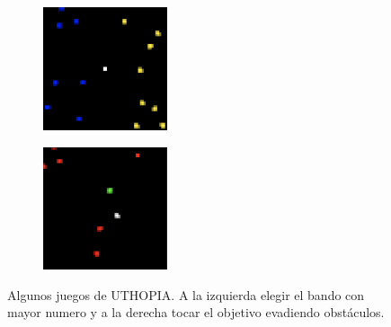 \begin{figure}[ht!]
    \centering
    \begin{subfigure}
      \centering
      \includegraphics[width=0.4\textwidth]{Graphics/uthopia_count_war_1.png}
      \label{fig:uthopia1}
    \end{subfigure}%
    \begin{subfigure}
      \centering
      \includegraphics[width=0.4\textwidth]{Graphics/uthopia_evade_1.png}
      \label{fig:uthopia2}
    \end{subfigure}%
    \caption{Algunos juegos de UTHOPIA. A la izquierda elegir el bando con mayor numero y a la derecha tocar el objetivo evadiendo obstáculos.}
    \label{fig:uthopia}
\end{figure}

